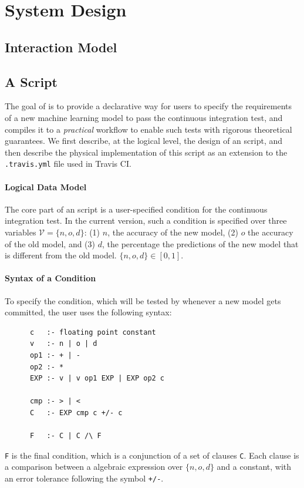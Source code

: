 \documentclass{article}
\begin{document}
\section{System Design}

\subsection{Interaction Model}


\subsection{A \sys Script}

The goal of \sys is to provide a declarative way for users
to specify the requirements of a new machine learning model
to pass the continuous integration test, and compiles
it to a {\em practical} workflow to enable such tests with
rigorous theoretical guarantees. We first describe,
at the logical level, the design of an \sys script, and
then describe the physical implementation of this script
as an extension to the \texttt{.travis.yml} file
used in Travis CI.

\paragraph*{Logical Data Model} The core part of an \sys
script is a user-specified condition for the continuous
integration test. In the current version, such a condition
is specified over three variables $\mathcal{V} = \{n, o, d\}$:
(1) $n$, the accuracy of the new model, (2) $o$ the
accuracy of the old model, and (3) $d$, the percentage
the predictions of the new model that is different from 
the old model. $\{n, o, d\} \in [0, 1]$.

\paragraph*{Syntax of a Condition}
To specify the condition, which will be tested by
\sys whenever a new model gets committed, the user
uses the following syntax:
\begin{verbatim}
      c   :- floating point constant
      v   :- n | o | d
      op1 :- + | -
      op2 :- *
      EXP :- v | v op1 EXP | EXP op2 c

      cmp :- > | < 
      C   :- EXP cmp c +/- c

      F   :- C | C /\ F
\end{verbatim}
\texttt{F} is the final condition, which is a 
conjunction of a set of clauses \texttt{C}.
Each clause is a comparison between a 
algebraic expression over $\{n, o, d\}$
and a constant, with an error tolerance 
following the symbol \texttt{+/-}.
\end{document}
